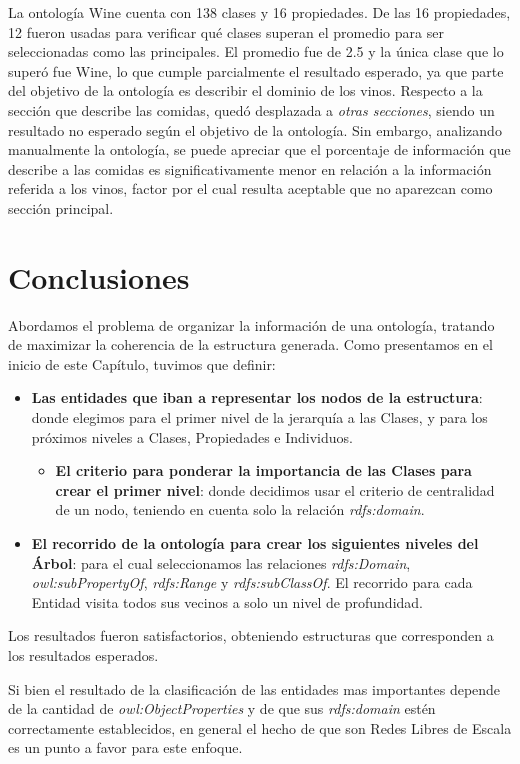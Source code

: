 La ontología Wine cuenta con 138 clases y 16 propiedades. De las 16 propiedades, 12 fueron usadas para verificar qué clases superan el promedio para ser seleccionadas como las principales. El promedio fue de 2.5 y la única clase que lo superó fue Wine, lo que cumple parcialmente el resultado esperado, ya que parte del objetivo de la ontología es describir el dominio de los vinos. Respecto a la sección que describe las comidas, quedó desplazada a \emph{otras secciones}, siendo un resultado no esperado según el objetivo de la ontología. Sin embargo, analizando manualmente la ontología, se puede apreciar que el porcentaje de  información que describe a las comidas es significativamente menor en relación a la información referida a los vinos, factor por el cual resulta aceptable que no aparezcan como sección principal.


\section{Conclusiones}
Abordamos el problema de organizar la información de una ontología, tratando de maximizar la coherencia de la estructura generada. Como presentamos en el inicio de este Capítulo, tuvimos que definir:
\begin{itemize}
    \item {\bf Las entidades que iban a representar los nodos de la estructura}: donde elegimos para el primer nivel de la jerarquía a las Clases, y para los próximos niveles a Clases, Propiedades e Individuos.
    \begin{itemize}
        \item {\bf El criterio para ponderar la importancia de las Clases para crear el primer nivel}: donde decidimos usar el criterio de centralidad de un nodo, teniendo en cuenta solo la relación \emph{rdfs:domain}.
    \end{itemize}
    \item {\bf El recorrido de la ontología para crear los siguientes niveles del Árbol}: para el cual seleccionamos las relaciones \emph{rdfs:Domain}, \emph{owl:subPropertyOf}, \emph{rdfs:Range} y \emph{rdfs:subClassOf}. El recorrido para cada Entidad visita todos sus vecinos a solo un nivel de profundidad.
\end{itemize}

Los resultados fueron satisfactorios, obteniendo estructuras que corresponden a los resultados esperados. 

Si bien el resultado de la clasificación de las entidades mas importantes depende de la cantidad de \emph{owl:ObjectProperties} y de que sus \emph{rdfs:domain} estén correctamente establecidos, en general el hecho de que son Redes Libres de Escala es un punto a favor para este enfoque.